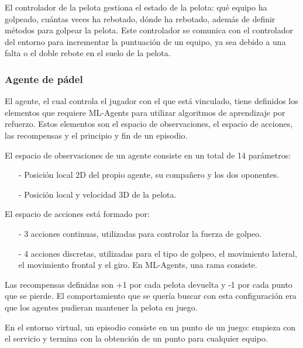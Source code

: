 El controlador de la pelota gestiona el estado de la pelota: qué equipo ha golpeado, cuántas veces ha rebotado, dónde ha rebotado, además de definir métodos para golpear la pelota. Este controlador se comunica con el controlador del entorno para incrementar la puntuación de un equipo, ya sea debido a una falta o el doble rebote en el suelo de la pelota.

\subsubsection{Agente de pádel}

El agente, el cual controla el jugador con el que está vinculado, tiene definidos los elementos que requiere ML-Agents para utilizar algoritmos de aprendizaje por refuerzo. Estos elementos son el espacio de observaciones, el espacio de acciones, las recompensas y el principio y fin de un episodio.

El espacio de observaciones de un agente consiste en un total de 14 parámetros:
\begin{enumerate}
    \item[-] Posición local 2D del propio agente, su compañero y los dos oponentes.
    \item[-] Posición local y velocidad 3D de la pelota.
\end{enumerate}

El espacio de acciones está formado por:
\begin{enumerate}
    \item[-] 3 acciones continuas, utilizadas para controlar la fuerza de golpeo.
    \item[-] 4 acciones discretas, utilizadas para el tipo de golpeo, el movimiento lateral, el movimiento frontal y el giro. En ML-Agents, una rama consiste.
\end{enumerate}

Las recompensas definidas son +1 por cada pelota devuelta y -1 por cada punto que se pierde. El comportamiento que se quería buscar con esta configuración era que los agentes pudieran mantener la pelota en juego.

En el entorno virtual, un episodio consiste en un punto de un juego: empieza con el servicio y termina con la obtención de un punto para cualquier equipo.

